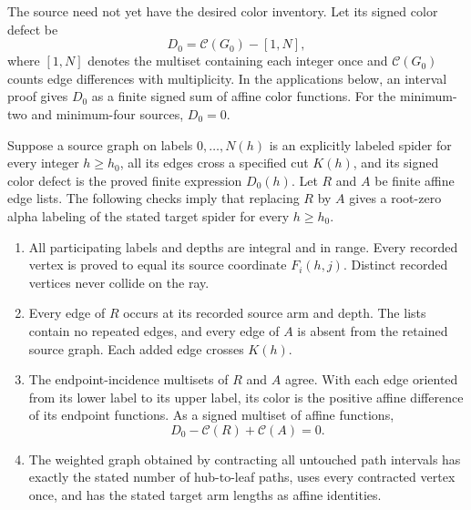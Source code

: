 The source need not yet have the desired color inventory.  Let its
signed color defect be
\[
 D_0=\mathcal C(G_0)-[1,N],
\]
where $[1,N]$ denotes the multiset containing each integer once and
$\mathcal C(G_0)$ counts edge differences with multiplicity.  In the
applications below, an interval proof gives $D_0$ as a finite signed
sum of affine color functions.  For the minimum-two and minimum-four
sources, $D_0=0$.

\begin{theorem}
\label{templates:soundness}
Suppose a source graph on labels $0,\ldots,N(h)$ is an explicitly
labeled spider for every integer $h\ge h_0$, all its edges cross a
specified cut $K(h)$, and its signed color defect is the proved
finite expression $D_0(h)$.  Let $R$ and $A$ be finite affine edge
lists.  The following checks imply that replacing $R$ by $A$ gives
a root-zero alpha labeling of the stated target spider for every
$h\ge h_0$.
\begin{enumerate}
\item All participating labels and depths are integral and in range.
Every recorded vertex is proved to equal its source coordinate
$F_i(h,j)$.  Distinct recorded vertices never collide on the ray.
\item Every edge of $R$ occurs at its recorded source arm and depth.
The lists contain no repeated edges, and every edge of $A$ is absent
from the retained source graph.  Each added edge crosses $K(h)$.
\item The endpoint-incidence multisets of $R$ and $A$ agree.  With
each edge oriented from its lower label to its upper label, its
color is the positive affine difference of its endpoint functions.
As a signed multiset of affine functions,
\begin{equation}\label{templates:color-identity}
 D_0-\mathcal C(R)+\mathcal C(A)=0.
\end{equation}
\item The weighted graph obtained by contracting all untouched path
intervals has exactly the stated number of hub-to-leaf paths, uses
every contracted vertex once, and has the stated target arm lengths
as affine identities.
\end{enumerate}
\end{theorem}

